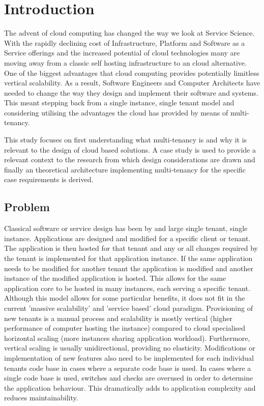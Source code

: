 \chapter{Introduction} 

The advent of cloud computing has changed the way we look at Service Science. With the rapidly declining cost of Infrastructure, Platform and Software as a Service offerings and the increased potential of cloud technologies many are moving away from a classic self hosting infrastructure to an cloud alternative. One of the biggest advantages that cloud computing provides potentially limitless vertical scalability. As a result, Software Engineers and Computer Architects have needed to change the way they design and implement their software and systems. This meant stepping back from a single instance, single tenant model and considering utilising the advantages the cloud has provided by means of multi-tenancy.

This study focuses on first understanding what multi-tenancy is and why it is relevant to the design of cloud based solutions. A case study is used to provide a relevant context to the research from which design considerations are drawn and finally an theoretical architecture implementing multi-tenancy for the specific case requirements is derived. 

\section{Problem}
Classical software or service design has been by and large single tenant, single instance. Applications are designed and modified for a specific client or tenant. The application is then hosted for that tenant and any or all changes required by the tenant is implemented for that application instance. If the same application needs to be modified for another tenant the application is modified and another instance of the modified application is hosted. This allows for the same application core to be hosted in many instances, each serving a specific tenant. Although this model allows for some particular benefits, it does not fit in the current 'massive scalability' and 'service based' cloud paradigm. Provisioning of new tenants is a manual process and scalability is mostly vertical (higher performance of computer hosting the instance) compared to cloud specialised horizontal scaling (more instances sharing application workload). Furthermore, vertical scaling is usually unidirectional, providing no elasticity. Modifications or implementation of new features also need to be implemented for each individual tenants code base in cases where a separate code base is used. In cases where a single code base is used, switches and checks are overused in order to determine the application behaviour. This dramatically adds to application complexity and reduces maintainability. 

